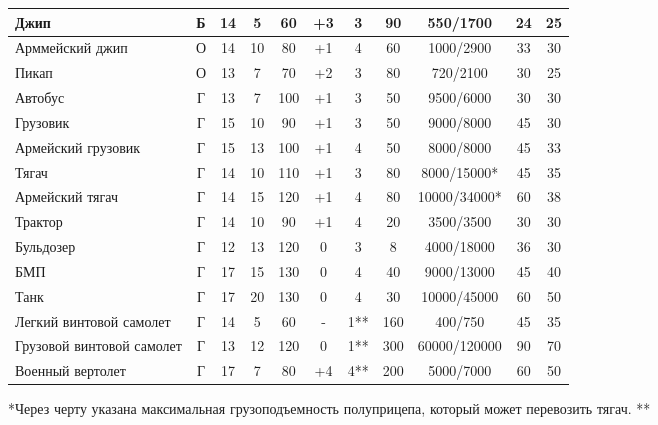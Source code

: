 \begin{center}
\begin{longtable}{|p{2.5cm}||c|c|c|c||c|c|c||c|c|c|}
Джип & 
Б & 14 & 5 & 60 & 
+3 & 3 & 90 & 
550/1700 & 24 & 25 \\ \hline

Арммейский джип & 
О & 14 & 10 & 80 & 
+1 & 4 & 60 & 
1000/2900 & 33 & 30 \\ \hline

Пикап & 
О & 13 & 7 & 70 & 
+2 & 3 & 80 & 
720/2100 & 30 & 25 \\ \hline

Автобус & 
Г & 13 & 7 & 100 & 
+1 & 3 & 50 & 
9500/6000 & 30 & 30 \\ \hline

Грузовик & 
Г & 15 & 10 & 90 & 
+1 & 3 & 50 & 
9000/8000 & 45 & 30 \\ \hline

Армейский грузовик & 
Г & 15 & 13 & 100 & 
+1 & 4 & 50 & 
8000/8000 & 45 & 33 \\ \hline

Тягач & 
Г & 14 & 10 & 110 & 
+1 & 3 & 80 & 
8000/15000* & 45 & 35 \\ \hline

Армейский тягач & 
Г & 14 & 15 & 120 & 
+1 & 4 & 80 & 
10000/34000* & 60 & 38 \\ \hline

Трактор & 
Г & 14 & 10 & 90 & 
+1 & 4 & 20 & 
3500/3500 & 30 & 30 \\ \hline

Бульдозер & 
Г & 12 & 13 & 120 & 
0 & 3 & 8 & 
4000/18000 & 36 & 30 \\ \hline

БМП & 
Г & 17 & 15 & 130 & 
0 & 4 & 40 & 
9000/13000 & 45 & 40 \\ \hline

Танк & 
Г & 17 & 20 & 130 & 
0 & 4 & 30 & 
10000/45000 & 60 & 50 \\ \hline

Легкий винтовой самолет & 
Г & 14 & 5 & 60 & 
- & 1** & 160 & 
400/750 & 45 & 35 \\ \hline

Грузовой винтовой самолет & 
Г & 13 & 12 & 120 & 
0 & 1** & 300 & 
60000/120000 & 90 & 70 \\ \hline

Военный вертолет & 
Г & 17 & 7 & 80 & 
+4 & 4** & 200 & 
5000/7000 & 60 & 50 \\ \hline

\end{longtable}
\end{center}




*Через черту указана максимальная грузоподъемность полуприцепа, который может перевозить тягач.
**